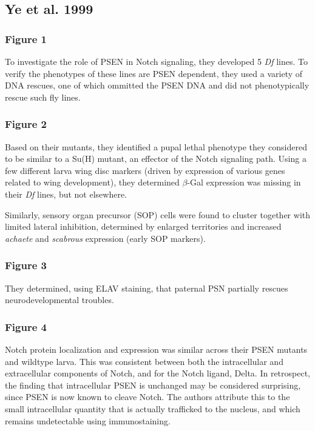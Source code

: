 \documentclass[12pt]{report}
\newcommand{\be}{\beta}
\begin{document}
\subsection*{Ye et al. 1999} 

\subsubsection*{Figure 1} To investigate the role of PSEN in Notch signaling, they developed 5 \textit{Df} lines. To verify the phenotypes of these lines are PSEN dependent, they used a variety of DNA rescues, one of which ommitted the PSEN DNA and did not phenotypically rescue such fly lines. 

\subsubsection*{Figure 2} Based on their mutants, they identified a pupal lethal phenotype they considered to be similar to a Su(H) mutant, an effector of the Notch signaling path. Using a few different larva wing disc markers (driven by expression of various genes related to wing development), they determined $\be$-Gal expression was missing in their \textit{Df} lines, but not elsewhere.\newline

Similarly, sensory organ precursor (SOP) cells were found to cluster together with limited lateral inhibition, determined by enlarged territories and increased \textit{achaete} and \textit{scabrous} expression (early SOP markers). 

\subsubsection*{Figure 3} They determined, using ELAV staining, that paternal PSN partially rescues neurodevelopmental troubles. 

\subsubsection*{Figure 4} 
Notch protein localization and expression was similar across their PSEN mutants and wildtype larva. This was consistent between both the intracellular and extracellular components of Notch, and for the Notch ligand, Delta. In retrospect, the finding that intracellular PSEN is unchanged may be considered surprising, since PSEN is now known to cleave Notch. The authors attribute this to the small intracellular quantity that is actually trafficked to the nucleus, and which remains undetectable using immunostaining.
\end{document}

